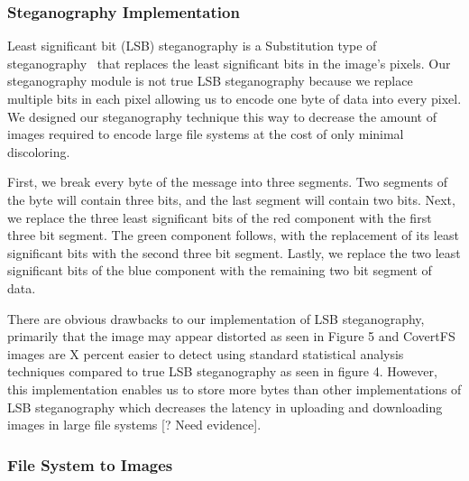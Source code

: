 \subsubsection{Steganography Implementation}

Least significant bit (LSB) steganography is a Substitution type of steganography~\cite{Nosrati2011} that replaces the least significant bits in the image's pixels. Our steganography module is not true LSB steganography because we replace multiple bits in each pixel allowing us to encode one byte of data into every pixel. We designed our steganography technique this way to decrease the amount of images required to encode large file systems at the cost of only minimal discoloring. 

First, we break every byte of the message into three segments. Two segments of the byte will contain three bits, and the last segment will contain two bits. Next, we replace the three least significant bits of the red component with the first three bit segment. The green component follows, with the replacement of its least significant bits with the second three bit segment. Lastly, we replace the two least significant bits of the blue component with the remaining two bit segment of data. 

There are obvious drawbacks to our implementation of LSB steganography, primarily that the image may appear distorted as seen in Figure 5 and CovertFS images are X percent easier to detect using standard statistical analysis techniques compared to true LSB steganography as seen in figure 4. However, this implementation enables us to store more bytes than other implementations of LSB steganography which decreases the latency in uploading and downloading images in large file systems [? Need evidence].
 
\subsubsection{File System to Images}

